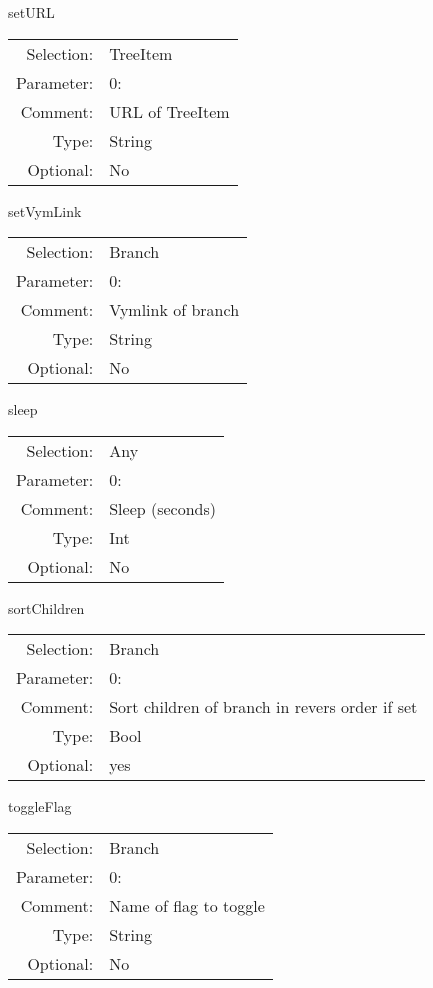 \item setURL\\
\begin{tabular}{rl}
  Selection: & TreeItem\\
   Parameter: &  0:\\
        Comment: & URL of TreeItem\\
           Type: & String\\
       Optional: &  No\\
\end{tabular}

\item setVymLink\\
\begin{tabular}{rl}
  Selection: & Branch\\
   Parameter: &  0:\\
        Comment: & Vymlink of branch\\
           Type: & String\\
       Optional: &  No\\
\end{tabular}

\item sleep\\
\begin{tabular}{rl}
  Selection: & Any\\
   Parameter: &  0:\\
        Comment: & Sleep (seconds)\\
           Type: & Int\\
       Optional: &  No\\
\end{tabular}

\item sortChildren\\
\begin{tabular}{rl}
  Selection: & Branch\\
   Parameter: &  0:\\
        Comment: & Sort children of branch in revers order if set\\
           Type: & Bool\\
       Optional: &  yes\\
\end{tabular}

\item toggleFlag\\
\begin{tabular}{rl}
  Selection: & Branch\\
   Parameter: &  0:\\
        Comment: & Name of flag to toggle\\
           Type: & String\\
       Optional: &  No\\
\end{tabular}


